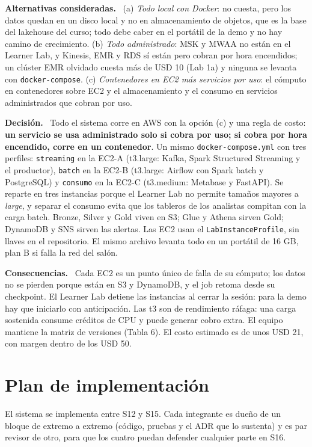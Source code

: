 \documentclass[12pt,letterpaper]{article}
\newcommand{\code}[1]{{\small\texttt{#1}}}
\newcommand{\adrpart}[1]{\textbf{#1.}~}
\begin{document}
\adrpart{Alternativas consideradas} (a) \emph{Todo local con Docker}: no cuesta, pero los datos quedan en un disco local y no en almacenamiento de objetos, que es la base del lakehouse del curso; todo debe caber en el portátil de la demo y no hay camino de crecimiento. (b) \emph{Todo administrado}: MSK y MWAA no están en el Learner Lab, y Kinesis, EMR y RDS sí están pero cobran por hora encendidos; un clúster EMR olvidado cuesta más de USD 10 (Lab 1a) y ninguna se levanta con \code{docker-compose}. (c) \emph{Contenedores en EC2 más servicios por uso}: el cómputo en contenedores sobre EC2 y el almacenamiento y el consumo en servicios administrados que cobran por uso.

\adrpart{Decisión} Todo el sistema corre en AWS con la opción (c) y una regla de costo: \textbf{un servicio se usa administrado solo si cobra por uso; si cobra por hora encendido, corre en un contenedor}. Un mismo \code{docker-compose.yml} con tres perfiles: \code{streaming} en la EC2-A (t3.large: Kafka, Spark Structured Streaming y el productor), \code{batch} en la EC2-B (t3.large: Airflow con Spark batch y PostgreSQL) y \code{consumo} en la EC2-C (t3.medium: Metabase y FastAPI). Se reparte en tres instancias porque el Learner Lab no permite tamaños mayores a \emph{large}, y separar el consumo evita que los tableros de los analistas compitan con la carga batch. Bronze, Silver y Gold viven en S3; Glue y Athena sirven Gold; DynamoDB y SNS sirven las alertas. Las EC2 usan el \code{LabInstanceProfile}, sin llaves en el repositorio. El mismo archivo levanta todo en un portátil de 16 GB, plan B si falla la red del salón.

\adrpart{Consecuencias} Cada EC2 es un punto único de falla de su cómputo; los datos no se pierden porque están en S3 y DynamoDB, y el job retoma desde su checkpoint. El Learner Lab detiene las instancias al cerrar la sesión: para la demo hay que iniciarlo con anticipación. Las t3 son de rendimiento ráfaga: una carga sostenida consume créditos de CPU y puede generar cobro extra. El equipo mantiene la matriz de versiones (Tabla 6). El costo estimado es de unos USD 21, con margen dentro de los USD 50.

\section{Plan de implementación}

El sistema se implementa entre S12 y S15. Cada integrante es dueño de un bloque de extremo a extremo (código, pruebas y el ADR que lo sustenta) y es par revisor de otro, para que los cuatro puedan defender cualquier parte en S16.
\end{document}

